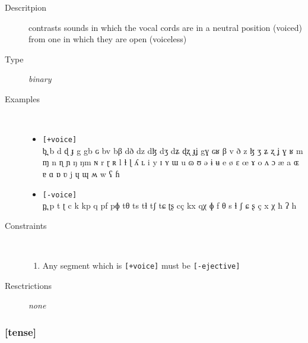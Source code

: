 \documentclass[10pt,letterpaper]{article}
\begin{document}
\begin{description}
\item[Descritpion] contrasts sounds in which the vocal cords are in a neutral position (voiced) from one in which they are open (voiceless)
\item[Type] \emph{binary}
\item[Examples]\
  \begin{itemize}
    \item \texttt{[+voice]}\\
    b̪ b d ɖ ɟ g gb ɢ bv bβ dð dz dɮ dʒ dʑ ɖʐ ɟʝ gɣ ɢʁ β v ð z ɮ ʒ ʑ ʐ ʝ ɣ ʁ m ɱ n ɳ ɲ ŋ ŋm ɴ r ɽ ʀ l ɫ ɭ ʎ ʟ i y ɪ ʏ ɯ u ɷ ʊ ə ɨ ʉ e ø ɛ œ ɤ o ʌ ɔ æ a ɶ ɐ ɑ ɒ ʋ j ɥ ɰ ʍ w ʕ ɦ 
    \item \texttt{[-voice]}\\
    p̪ p t ʈ c k kp q pf pɸ tθ ts tɬ tʃ tɕ ʈʂ cç kx qχ ɸ f θ s ɬ ʃ ɕ ʂ ç x χ ħ ʔ h 
  \end{itemize}
\item[Constraints]\
  \begin{enumerate}
    \item Any segment which is \texttt{[+voice]} must be \texttt{[-ejective]}
  \end{enumerate} 
\item[Resctrictions] \emph{none}
\end{description}

\subsubsection{[tense]}
\label{ssub:feature_tense}
\end{document}
